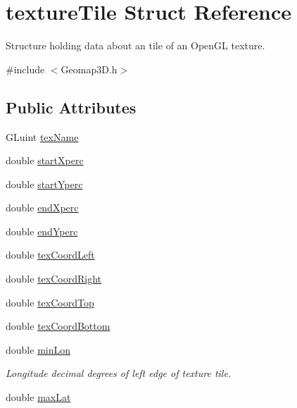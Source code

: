\hypertarget{structtexture_tile}{
\section{textureTile Struct Reference}
\label{structtexture_tile}
}


Structure holding data about an tile of an OpenGL texture.  




{\ttfamily \#include $<$Geomap3D.h$>$}

\subsection*{Public Attributes}
\begin{DoxyCompactItemize}
\item 
GLuint \hyperlink{structtexture_tile_a11cd1eb0c320bce784e0545446a4dcfb}{texName}
\item 
double \hyperlink{structtexture_tile_a988262225d6d9871c0fb4d9068a472ce}{startXperc}
\item 
double \hyperlink{structtexture_tile_ab7429d2be77dbe8785c4e7d3a281961a}{startYperc}
\item 
double \hyperlink{structtexture_tile_aebe32c7e9b5ef7c4b309c744c99469a9}{endXperc}
\item 
double \hyperlink{structtexture_tile_af57335249bbbac5818bb94a0371463fd}{endYperc}
\item 
double \hyperlink{structtexture_tile_ab061d3a02764d817e149fa5c88e809ab}{texCoordLeft}
\item 
double \hyperlink{structtexture_tile_aa1d1ce9a19f9152c63f8495dfe1cb3d5}{texCoordRight}
\item 
double \hyperlink{structtexture_tile_a1edb8965ab455cfbca98fcdc4e81076c}{texCoordTop}
\item 
double \hyperlink{structtexture_tile_ab666fa6d9772547b6108181629b0bcc3}{texCoordBottom}
\item 
\hypertarget{structtexture_tile_ab1f1926d5e4341aafd7c6557f1765710}{
double \hyperlink{structtexture_tile_ab1f1926d5e4341aafd7c6557f1765710}{minLon}}
\label{structtexture_tile_ab1f1926d5e4341aafd7c6557f1765710}

\begin{DoxyCompactList}\small\item\em Longitude decimal degrees of left edge of texture tile. \end{DoxyCompactList}\item 
\hypertarget{structtexture_tile_aaf7338e6ffd5fb9f218845b5b5bbc79d}{
double \hyperlink{structtexture_tile_aaf7338e6ffd5fb9f218845b5b5bbc79d}{maxLat}}
\label{structtexture_tile_aaf7338e6ffd5fb9f218845b5b5bbc79d}


\end{DoxyCompactItemize}
